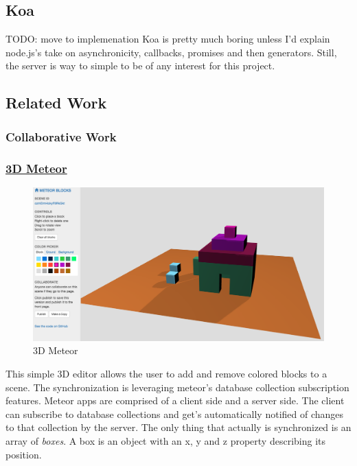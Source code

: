 \subsection{Koa}\label{koa}

TODO: move to implemenation Koa is pretty much boring unless I'd explain
node.js's take on asynchronicity, callbacks, promises and then
generators. Still, the server is way to simple to be of any interest for
this project.

\subsection{Related Work}\label{related-work}

\subsubsection{Collaborative Work}\label{collaborative-work}

\subsubsection{\texorpdfstring{\href{http://3d.meteor.com/}{3D
Meteor}}{3D Meteor}}\label{d-meteor0}

\begin{figure}[htbp]
  \centering
  \includegraphics[width=12cm]{../assets/3dmeteor.png}
  \caption{3D Meteor}
	\label{fig:3dmeteor}
\end{figure}

This simple 3D editor allows the user to add and remove colored blocks
to a scene. The synchronization is leveraging meteor's database
collection subscription features. Meteor apps are comprised of a client
side and a server side. The client can subscribe to database collections
and get's automatically notified of changes to that collection by the
server. The only thing that actually is synchronized is an array of
\emph{boxes}. A box is an object with an x, y and z property describing
its position.

